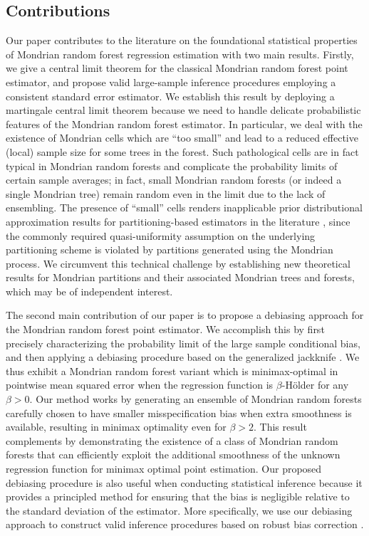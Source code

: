 \subsection{Contributions}

Our paper contributes to the literature on
the foundational statistical properties
of Mondrian random forest regression estimation with two main results.
Firstly, we give a central limit theorem
for the classical Mondrian random forest point estimator,
and propose valid large-sample inference procedures employing a consistent
standard error estimator.
We establish this result by
deploying a martingale central limit theorem
\citep[Theorem~3.2]{hall2014martingale} because we need to handle delicate
probabilistic features of the Mondrian random forest estimator.
In particular, we deal with the existence of
Mondrian cells which are ``too small''
and lead to a reduced effective (local) sample size
for some trees in the forest.
Such pathological cells are in fact typical in Mondrian random forests and
complicate the probability limits of certain sample averages; in fact, small
Mondrian random forests (or indeed a single Mondrian tree) remain random even
in the limit due to the lack of ensembling. The presence of ``small'' cells
renders inapplicable prior distributional approximation results for
partitioning-based estimators in the literature
\citep{huang2003local,cattaneo2020large}, since the commonly required
quasi-uniformity assumption on the underlying partitioning scheme is violated
by partitions generated using the Mondrian process. We circumvent this
technical challenge by establishing new theoretical results for Mondrian
partitions and their associated Mondrian trees and forests, which may be of
independent interest.

The second main contribution of our paper is to propose a debiasing approach
for the Mondrian random forest point estimator.
We accomplish this by first precisely characterizing the probability limit
of the large sample conditional bias, and then applying a debiasing procedure
based on the generalized jackknife \citep{schucany1977improvement}.
We thus exhibit a Mondrian random forest variant which is minimax-optimal
in pointwise mean squared error when the
regression function is $\beta$-H{\"o}lder
for any $\beta > 0$.
Our method works by generating an ensemble of Mondrian random forests
carefully chosen to have smaller misspecification bias
when extra smoothness is available,
resulting in minimax optimality even for $\beta > 2$.
This result complements \citet{mourtada2020minimax} by demonstrating the
existence of a class of Mondrian random forests that can efficiently exploit
the additional smoothness of the unknown regression function for minimax
optimal point estimation.
Our proposed debiasing procedure is also useful when conducting
statistical inference because it provides a principled method
for ensuring that the bias is negligible relative
to the standard deviation of the estimator.
More specifically, we use our debiasing approach to construct
valid inference procedures based on robust bias correction
\citep{calonico2018jasa,calonico2022bernoulli}.

